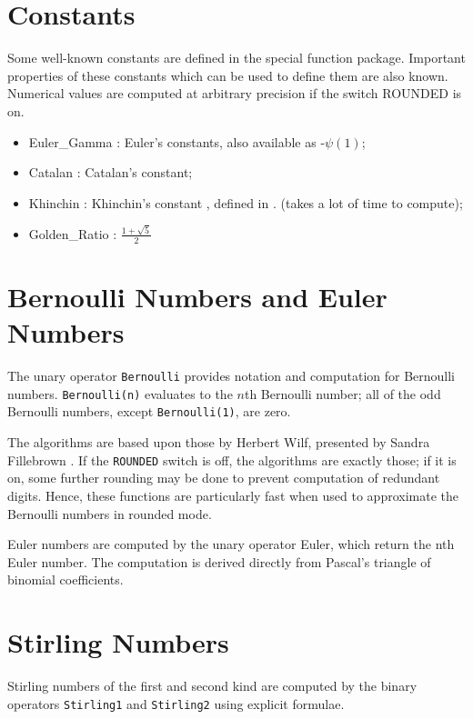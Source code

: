 \section{Constants}

Some well-known constants are defined in the special function package.
Important properties of these constants which can be used to define them
are also known. Numerical values are computed  at arbitrary precision
if the switch ROUNDED is on.

\begin{itemize}
\item Euler\_Gamma : Euler's constants, also available as -$\psi(1)$;
\item Catalan : Catalan's constant;
\item Khinchin : Khinchin's constant , defined in  \cite{Khinchin:64}.
 (takes a lot of time to compute);
\item Golden\_Ratio : $\frac{1 + \sqrt{5}}{2}$
\end{itemize}


\section{Bernoulli Numbers and Euler Numbers}

The unary operator {\tt Bernoulli} provides notation and computation for
Bernoulli numbers.  {\tt Bernoulli(n)} evaluates to the $n$th Bernoulli
number; all of the odd Bernoulli numbers, except {\tt Bernoulli(1)}, are
zero.

The algorithms are based upon those by Herbert Wilf, presented by Sandra
Fillebrown \cite{Fillebrown:92}.  If the {\tt ROUNDED} switch is off,
the algorithms are exactly those; if it is on, some further rounding may
be done to prevent computation of redundant digits.  Hence, these
functions are particularly fast when used to approximate the Bernoulli
numbers in rounded mode.

Euler numbers are computed by the unary operator Euler, which
return the nth Euler number. The computation is derived
directly from Pascal's triangle of binomial coefficients.


\section{Stirling Numbers}
Stirling numbers of the first and second kind are computed
by the binary operators {\tt Stirling1} and {\tt Stirling2}
using explicit formulae.


